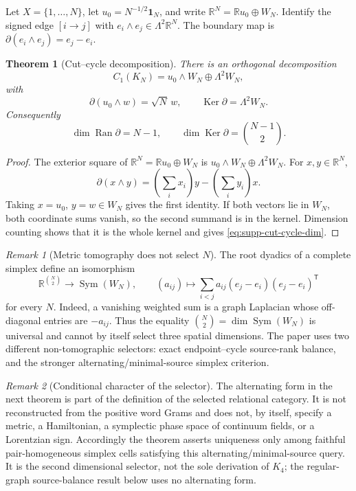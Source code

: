 \documentclass[11pt]{article}
\newtheorem{theorem}{Theorem}[section]
\numberwithin{equation}{section}
\theoremstyle{definition}
\theoremstyle{remark}
\newtheorem{remark}[remark]{Remark}
\newcommand{\R}{\mathbb R}
\newcommand{\one}{\mathbf 1}
\newcommand{\Ker}{\operatorname{Ker}}
\newcommand{\Ran}{\operatorname{Ran}}
\newcommand{\Sym}{\operatorname{Sym}}
\begin{document}
Let $X=\{1,\ldots,N\}$, let $u_0=N^{-1/2}\one_N$, and write
$\R^N=\R u_0\oplus W_N$.  Identify the signed edge $[i\to j]$ with
$e_i\wedge e_j\in\Lambda^2\R^N$.  The boundary map is
$\partial(e_i\wedge e_j)=e_j-e_i$.

\begin{theorem}[Cut--cycle decomposition]
\label{thm:supp-cut-cycle}
There is an orthogonal decomposition
\begin{equation}
 C_1(K_N)=u_0\wedge W_N\oplus\Lambda^2W_N,
 \label{eq:supp-cut-cycle}
\end{equation}
with
\begin{equation}
 \partial(u_0\wedge w)=\sqrt N\,w,
 \qquad
 \Ker\partial=\Lambda^2W_N.
 \label{eq:supp-boundary-action}
\end{equation}
Consequently
\begin{equation}
 \dim\Ran\partial=N-1,
 \qquad
 \dim\Ker\partial=\binom{N-1}{2}.
 \label{eq:supp-cut-cycle-dim}
\end{equation}
\end{theorem}

\begin{proof}
The exterior square of
$\R^N=\R u_0\oplus W_N$ is
$u_0\wedge W_N\oplus\Lambda^2W_N$.  For $x,y\in\R^N$,
\[
 \partial(x\wedge y)
 =\left(\sum_ix_i\right)y-
   \left(\sum_iy_i\right)x.
\]
Taking $x=u_0$, $y=w\in W_N$ gives the first identity.  If both vectors lie in
$W_N$, both coordinate sums vanish, so the second summand is in the kernel.
Dimension counting shows that it is the whole kernel and gives
\eqref{eq:supp-cut-cycle-dim}.
\end{proof}

\begin{remark}[Metric tomography does not select $N$]
The root dyadics of a complete simplex define an isomorphism
\[
 \R^{\binom N2}\longrightarrow\Sym(W_N),
 \qquad
 (a_{ij})\longmapsto\sum_{i<j}a_{ij}
 (e_j-e_i)(e_j-e_i)^{\mathsf T}
\]
for every $N$.  Indeed, a vanishing weighted sum is a graph Laplacian whose
off-diagonal entries are $-a_{ij}$.  Thus the equality
$\binom N2=\dim\Sym(W_N)$ is universal and cannot by itself select three
spatial dimensions.  The paper uses two different non-tomographic selectors:
exact endpoint--cycle source-rank balance, and the stronger
alternating/minimal-source simplex criterion.
\end{remark}

\begin{remark}[Conditional character of the selector]
The alternating form in the next theorem is part of the definition of the
selected relational category.  It is not reconstructed from the positive word
Grams and does not, by itself, specify a metric, a Hamiltonian, a symplectic
phase space of continuum fields, or a Lorentzian sign.  Accordingly the theorem
asserts uniqueness only among faithful pair-homogeneous simplex cells satisfying
this alternating/minimal-source query.  It is the second dimensional selector,
not the sole derivation of $K_4$; the regular-graph source-balance result below
uses no alternating form.
\end{remark}
\end{document}
